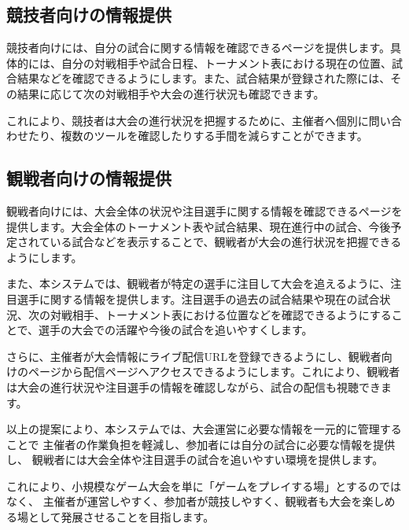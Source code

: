 \subsection{競技者向けの情報提供}
競技者向けには、自分の試合に関する情報を確認できるページを提供します。具体的には、自分の対戦相手や試合日程、トーナメント表における現在の位置、試合結果などを確認できるようにします。また、試合結果が登録された際には、その結果に応じて次の対戦相手や大会の進行状況も確認できます。

これにより、競技者は大会の進行状況を把握するために、主催者へ個別に問い合わせたり、複数のツールを確認したりする手間を減らすことができます。
\subsection{観戦者向けの情報提供}
観戦者向けには、大会全体の状況や注目選手に関する情報を確認できるページを提供します。大会全体のトーナメント表や試合結果、現在進行中の試合、今後予定されている試合などを表示することで、観戦者が大会の進行状況を把握できるようにします。

また、本システムでは、観戦者が特定の選手に注目して大会を追えるように、注目選手に関する情報を提供します。注目選手の過去の試合結果や現在の試合状況、次の対戦相手、トーナメント表における位置などを確認できるようにすることで、選手の大会での活躍や今後の試合を追いやすくします。

さらに、主催者が大会情報にライブ配信URLを登録できるようにし、観戦者向けのページから配信ページへアクセスできるようにします。これにより、観戦者は大会の進行状況や注目選手の情報を確認しながら、試合の配信も視聴できます。


以上の提案により、本システムでは、大会運営に必要な情報を一元的に管理することで
主催者の作業負担を軽減し、参加者には自分の試合に必要な情報を提供し、
観戦者には大会全体や注目選手の試合を追いやすい環境を提供します。

これにより、小規模なゲーム大会を単に「ゲームをプレイする場」とするのではなく、
主催者が運営しやすく、参加者が競技しやすく、観戦者も大会を楽しめる場として発展させることを目指します。
